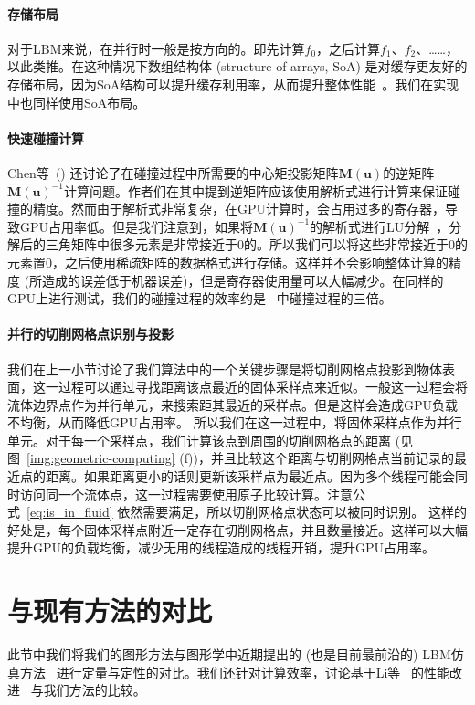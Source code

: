 \paragraph{存储布局}
对于LBM来说，在并行时一般是按方向的。即先计算$f_0$，之后计算$f_1$、$f_2$、……，以此类推。在这种情况下数组结构体 (structure-of-arrays, SoA) 是对缓存更友好的存储布局，因为SoA结构可以提升缓存利用率，从而提升整体性能~\cite{Chen-2021}。我们在实现中也同样使用SoA布局。

\paragraph{快速碰撞计算}
Chen等~(\citeyear{Chen-2021}) 还讨论了在碰撞过程中所需要的中心矩投影矩阵$\bm{M}(\bm{u})$的逆矩阵$\bm{M}(\bm{u})^{-1}$计算问题。作者们在其中提到逆矩阵应该使用解析式进行计算来保证碰撞的精度。然而由于解析式非常复杂，在GPU计算时，会占用过多的寄存器，导致GPU占用率低。但是我们注意到，如果将$\bm{M}(\bm{u})^{-1}$的解析式进行LU分解~\cite{fei2018three}，分解后的三角矩阵中很多元素是非常接近于0的。所以我们可以将这些非常接近于0的元素置0，之后使用稀疏矩阵的数据格式进行存储。这样并不会影响整体计算的精度 (所造成的误差低于机器误差)，但是寄存器使用量可以大幅减少。在同样的GPU上进行测试，我们的碰撞过程的效率约是~\cite{Chen-2021} 中碰撞过程的三倍。

\paragraph{并行的切削网格点识别与投影}
我们在上一小节讨论了我们算法中的一个关键步骤是将切削网格点投影到物体表面，这一过程可以通过寻找距离该点最近的固体采样点来近似。一般这一过程会将流体边界点作为并行单元，来搜索距其最近的采样点。但是这样会造成GPU负载不均衡，从而降低GPU占用率。
所以我们在这一过程中，将固体采样点作为并行单元。对于每一个采样点，我们计算该点到周围的切削网格点的距离 (见图~\ref{img:geometric-computing} (f))，并且比较这个距离与切削网格点当前记录的最近点的距离。如果距离更小的话则更新该采样点为最近点。因为多个线程可能会同时访问同一个流体点，这一过程需要使用原子比较计算。注意公式~\ref{eq:is_in_fluid} 依然需要满足，所以切削网格点状态可以被同时识别。
这样的好处是，每个固体采样点附近一定存在切削网格点，并且数量接近。这样可以大幅提升GPU的负载均衡，减少无用的线程造成的线程开销，提升GPU占用率。

\section{与现有方法的对比}
此节中我们将我们的图形方法与图形学中近期提出的 (也是目前最前沿的) LBM仿真方法~\cite{Li-2020} 进行定量与定性的对比。我们还针对计算效率，讨论基于Li等~\citeyear{Li-2020} 的性能改进~\cite{Chen-2021} 与我们方法的比较。

